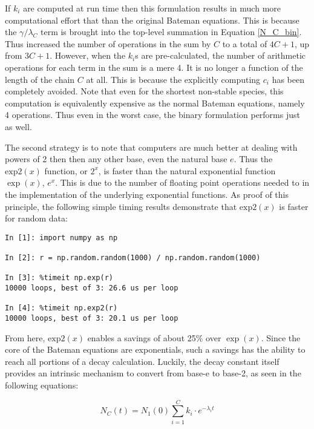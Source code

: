 \documentclass{anstrans}
\begin{document}
If $k_i$ are computed at run time then this formulation results in much 
more computational effort that than the original Bateman equations. This is 
because the $\gamma/\lambda_C$ term is brought into the top-level summation 
in Equation \ref{N_C_bin}. Thus increased the number of operations in the 
sum by $C$ to a total of $4C+1$, up from $3C+1$.
However, when the $k_i$s  are pre-calculated, 
the number of arithmetic operations for each term in the sum is a mere 4.
It is no longer a function of the length of the chain $C$ at all.  This is 
because the explicitly computing $c_i$ has been completely avoided.
Note that even for the shortest non-stable species, this computation is 
equivalently expensive as the normal Bateman equations, namely 4 operations.
Thus even in the worst case, the binary formulation performs just as well.

The second strategy is to note that computers are much better at dealing with 
powers of 2 then then any other base, even the natural base $e$. Thus the 
$\mathrm{exp2}(x)$ function, or $2^x$, is faster than the natural exponential 
function $\exp(x)$, $e^x$.  This is due to the number of floating point
operations needed to in the implementation of the underlying exponential 
functions. As proof of this principle, the following simple timing results
demonstrate that $\mathrm{exp2}(x)$ is faster for random data:

\begin{lstlisting}[caption={Exponential Timing Comparison}, 
                   label=expcmp]
In [1]: import numpy as np

In [2]: r = np.random.random(1000) / np.random.random(1000)

In [3]: %timeit np.exp(r)
10000 loops, best of 3: 26.6 us per loop

In [4]: %timeit np.exp2(r)
10000 loops, best of 3: 20.1 us per loop
\end{lstlisting}

From here, $\mathrm{exp2}(x)$ enables a savings of about 25\% over 
$\exp(x)$.  Since the core of the Bateman equations are exponentials, 
such a savings has the ability to reach all portions of a decay calculation.
Luckily, the decay constant itself provides an intrinsic mechanism to convert 
from base-e to base-2, as seen in the following equations:

\begin{equation}
\label{b2-0}
N_C(t) = N_1(0) \sum_{i=1}^C k_{i} \cdot e^{-\lambda_i t}
\end{equation}
\end{document}
